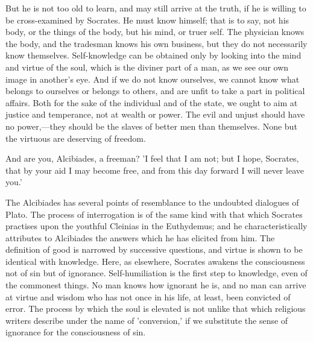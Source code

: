 \documentclass[11pt,letter]{article}
\begin{document}
\par  But he is not too old to learn, and may still arrive at the truth, if he is willing to be cross-examined by Socrates. He must know himself; that is to say, not his body, or the things of the body, but his mind, or truer self. The physician knows the body, and the tradesman knows his own business, but they do not necessarily know themselves. Self-knowledge can be obtained only by looking into the mind and virtue of the soul, which is the diviner part of a man, as we see our own image in another's eye. And if we do not know ourselves, we cannot know what belongs to ourselves or belongs to others, and are unfit to take a part in political affairs. Both for the sake of the individual and of the state, we ought to aim at justice and temperance, not at wealth or power. The evil and unjust should have no power,—they should be the slaves of better men than themselves. None but the virtuous are deserving of freedom.

\par  And are you, Alcibiades, a freeman? 'I feel that I am not; but I hope, Socrates, that by your aid I may become free, and from this day forward I will never leave you.'

\par  The Alcibiades has several points of resemblance to the undoubted dialogues of Plato. The process of interrogation is of the same kind with that which Socrates practises upon the youthful Cleinias in the Euthydemus; and he characteristically attributes to Alcibiades the answers which he has elicited from him. The definition of good is narrowed by successive questions, and virtue is shown to be identical with knowledge. Here, as elsewhere, Socrates awakens the consciousness not of sin but of ignorance. Self-humiliation is the first step to knowledge, even of the commonest things. No man knows how ignorant he is, and no man can arrive at virtue and wisdom who has not once in his life, at least, been convicted of error. The process by which the soul is elevated is not unlike that which religious writers describe under the name of 'conversion,' if we substitute the sense of ignorance for the consciousness of sin.
\end{document}
